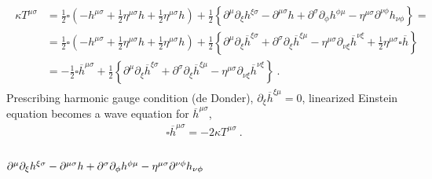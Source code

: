 \documentclass[letterpaper,10pt,english]{jupyterBook}
\begin{document}
\begin{equation*}
\begin{split}\begin{aligned}
  \kappa T^{\mu \sigma}
  & = \frac{1}{2} \square \left( - h^{\mu \sigma} + \frac{1}{2} \eta^{\mu \sigma} h + \frac{1}{2} \eta^{\mu \sigma} h \right) + \frac{1}{2} \left\{ \partial^{\mu} \partial_{\xi} h^{\xi \sigma} - \partial^{\mu \sigma} h + \partial^{\sigma} \partial_{\phi} h^{\phi \mu} - \eta^{\mu \sigma} \partial^{\nu \phi} h_{\nu \phi} \right\} = \\
  & = \frac{1}{2} \square \left( - h^{\mu \sigma} + \frac{1}{2} \eta^{\mu \sigma} h + \frac{1}{2} \eta^{\mu \sigma} h \right) + \frac{1}{2} \left\{  \partial^{\mu} \partial_{\xi} \overline{h}^{\xi \sigma} + \partial^{\sigma} \partial_{\xi} \overline{h}^{\xi \mu} - \eta^{\mu \sigma} \partial_{\nu \xi} \overline{h}^{\nu \xi} + \frac{1}{2} \eta^{\mu \sigma} \square \overline{h} \right\}  \\
  & = - \frac{1}{2} \square \overline{h}^{\mu \sigma} + \frac{1}{2} \left\{  \partial^{\mu} \partial_{\xi} \overline{h}^{\xi \sigma} + \partial^{\sigma} \partial_{\xi} \overline{h}^{\xi \mu} - \eta^{\mu \sigma} \partial_{\nu \xi} \overline{h}^{\nu \xi}  \right\} \ .
\end{aligned}\end{split}
\end{equation*}
\sphinxAtStartPar
Prescribing harmonic gauge condition (de Donder), \(\partial_{\xi} \overline{h}^{\xi \mu} = 0\), linearized Einstein equation becomes a wave equation for \(\overline{h}^{\mu \sigma}\),
\begin{equation*}
\begin{split}\square \overline{h}^{\mu \sigma} = - 2 \kappa T^{\mu \sigma} \ .\end{split}
\end{equation*}\subsubsection*{\protect\(\partial^{\mu} \partial_{\xi} h^{\xi \sigma} - \partial^{\mu \sigma} h + \partial^{\sigma} \partial_{\phi} h^{\phi \mu} - \eta^{\mu \sigma} \partial^{\nu \phi} h_{\nu \phi}\protect\)}
\end{document}
